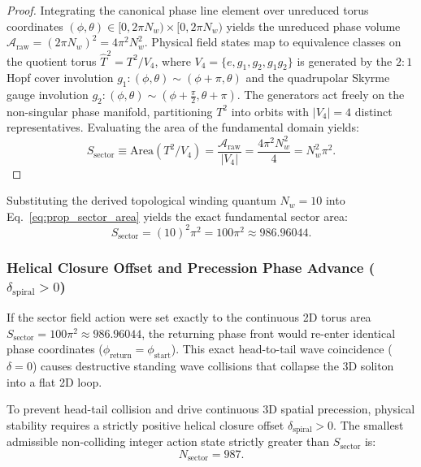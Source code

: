 \documentclass[11pt,a4paper]{article}
\begin{document}
	\begin{proof}
		Integrating the canonical phase line element over unreduced torus coordinates $(\phi, \theta) \in [0, 2\pi N_w) \times [0, 2\pi N_w)$ yields the unreduced phase volume $\mathcal{A}_{\text{raw}} = (2\pi N_w)^2 = 4\pi^2 N_w^2$. Physical field states map to equivalence classes on the quotient torus $\widehat{T}^2 = T^2 / V_4$, where $V_4 = \{e, g_1, g_2, g_1 g_2\}$ is generated by the $2:1$ Hopf cover involution $g_1: (\phi, \theta) \sim (\phi + \pi, \theta)$ and the quadrupolar Skyrme gauge involution $g_2: (\phi, \theta) \sim \left(\phi + \frac{\pi}{2}, \theta + \pi\right)$. The generators act freely on the non-singular phase manifold, partitioning $T^2$ into orbits with $|V_4| = 4$ distinct representatives. Evaluating the area of the fundamental domain yields:
		\begin{equation}
			S_{\text{sector}} \equiv \text{Area}\left(T^2 / V_4\right) = \frac{\mathcal{A}_{\text{raw}}}{|V_4|} = \frac{4\pi^2 N_w^2}{4} = N_w^2 \pi^2.
		\end{equation}
	\end{proof}
	
	Substituting the derived topological winding quantum $N_w = 10$ into Eq.\ \eqref{eq:prop_sector_area} yields the exact fundamental sector area:
	\begin{equation}
		S_{\text{sector}} = (10)^2 \pi^2 = 100\pi^2 \approx 986.96044.
		\label{eq:sector_area_100pi2_final}
	\end{equation}
	
	\subsubsection{Helical Closure Offset and Precession Phase Advance ($\delta_{\text{spiral}} > 0$)}
	\label{sec:helical_closure_offset}
	
	If the sector field action were set exactly to the continuous 2D torus area $S_{\text{sector}} = 100\pi^2 \approx 986.96044$, the returning phase front would re-enter identical phase coordinates ($\phi_{\text{return}} = \phi_{\text{start}}$). This exact head-to-tail wave coincidence ($\delta = 0$) causes destructive standing wave collisions that collapse the 3D soliton into a flat 2D loop.
	
	To prevent head-tail collision and drive continuous 3D spatial precession, physical stability requires a strictly positive helical closure offset $\delta_{\text{spiral}} > 0$. The smallest admissible non-colliding integer action state strictly greater than $S_{\text{sector}}$ is:
	\begin{equation}
		N_{\text{sector}} = 987.
		\label{eq:N_sector_noncollision}
	\end{equation}
	
\end{document}
